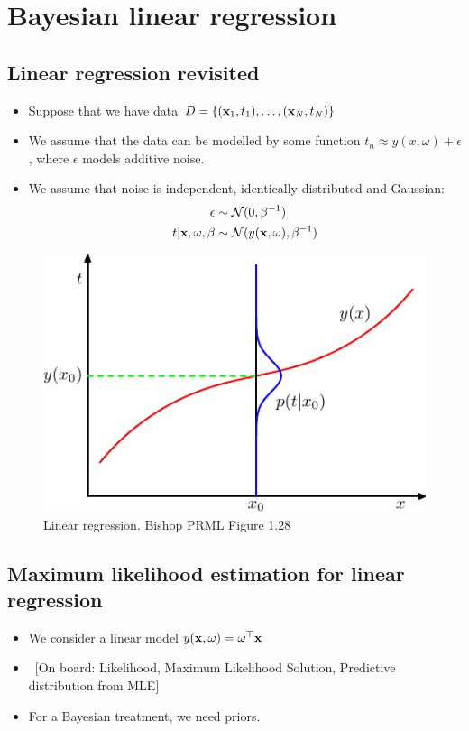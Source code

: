 \section{Bayesian linear regression}

\subsection{Linear regression revisited}
\begin{itemize}
\item Suppose that we have data $D=\{({\mathbf{x}}_1, t_1), \ldots, ({\mathbf{x}}_N, t_N) \}$
\item We assume that the data can be modelled by some function $t_n \approx y(x, \omega)+ \epsilon$, where $\epsilon$ models additive noise.
\item  We assume that noise is independent, identically distributed and Gaussian: 
\begin{align}
	\epsilon &\sim \mathcal{N}(0,\beta^{-1})\\
	t|{\mathbf{x}}, \omega, \beta &\sim \mathcal{N}(y({\mathbf{x}},\omega), \beta^{-1})
\end{align}
\end{itemize}

\begin{figure}
	\centering
	\includegraphics[width=.5\textwidth]{./lecture5/Figure128.pdf}
	\caption{Linear regression. Bishop PRML Figure 1.28}
\end{figure}


\subsection{Maximum likelihood estimation for linear regression}
\begin{itemize}
\item We consider a linear model $y({\mathbf{x}},\omega)= \omega^\top {\mathbf{x}}$
\item ~[On board: Likelihood, Maximum Likelihood Solution, Predictive distribution from MLE]\\
\item  For a Bayesian treatment, we need priors.
\end{itemize}

